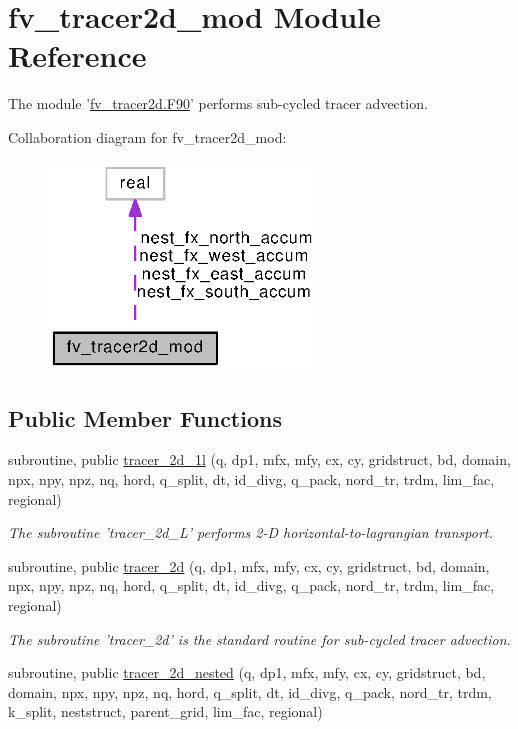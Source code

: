 \section{fv\-\_\-tracer2d\-\_\-mod Module Reference}
\label{classfv__tracer2d__mod}


The module '\hyperlink{fv__tracer2d_8F90}{fv\-\_\-tracer2d.\-F90}' performs sub-\/cycled tracer advection.  




Collaboration diagram for fv\-\_\-tracer2d\-\_\-mod\-:
\nopagebreak
\begin{figure}[H]
\begin{center}
\leavevmode
\includegraphics[width=201pt]{classfv__tracer2d__mod__coll__graph}
\end{center}
\end{figure}
\subsection*{Public Member Functions}
\begin{DoxyCompactItemize}
\item 
subroutine, public \hyperlink{classfv__tracer2d__mod_ad980c5de5fcd3b7ace218eb30359eae3}{tracer\-\_\-2d\-\_\-1l} (q, dp1, mfx, mfy, cx, cy, gridstruct, bd, domain, npx, npy, npz, nq, hord, q\-\_\-split, dt, id\-\_\-divg, q\-\_\-pack, nord\-\_\-tr, trdm, lim\-\_\-fac, regional)
\begin{DoxyCompactList}\small\item\em The subroutine 'tracer\-\_\-2d\-\_\-L' performs 2-\/\-D horizontal-\/to-\/lagrangian transport. \end{DoxyCompactList}\item 
subroutine, public \hyperlink{classfv__tracer2d__mod_a4918bade9446e44f288de345d368acbb}{tracer\-\_\-2d} (q, dp1, mfx, mfy, cx, cy, gridstruct, bd, domain, npx, npy, npz, nq, hord, q\-\_\-split, dt, id\-\_\-divg, q\-\_\-pack, nord\-\_\-tr, trdm, lim\-\_\-fac, regional)
\begin{DoxyCompactList}\small\item\em The subroutine 'tracer\-\_\-2d' is the standard routine for sub-\/cycled tracer advection. \end{DoxyCompactList}\item 
subroutine, public \hyperlink{classfv__tracer2d__mod_a23b2bdc9c60a39458ebd937e961d334e}{tracer\-\_\-2d\-\_\-nested} (q, dp1, mfx, mfy, cx, cy, gridstruct, bd, domain, npx, npy, npz, nq, hord, q\-\_\-split, dt, id\-\_\-divg, q\-\_\-pack, nord\-\_\-tr, trdm, k\-\_\-split, neststruct, parent\-\_\-grid, lim\-\_\-fac, regional)
\end{DoxyCompactItemize}
